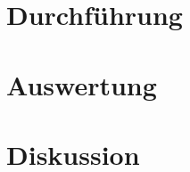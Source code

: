 
\section{Durchführung}



\section{Auswertung}



\section{Diskussion}


\newpage
\printbibliography

